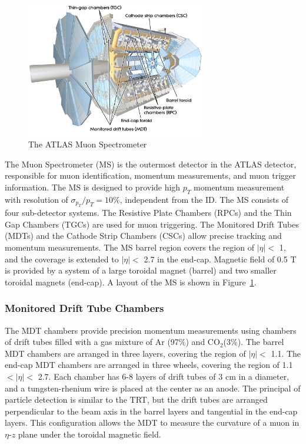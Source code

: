 \begin{figure}[!htb]
    \includegraphics[width=0.7\textwidth]{figures/ms.png}
    \centering
    \caption{The ATLAS Muon Spectrometer}
    \label{fig:ms}
\end{figure}
The Muon Spectrometer (MS) is the outermost detector in the ATLAS detector, responsible for muon identification, momentum measurements, and muon trigger information. The MS is designed to provide high $p_{T}$ momentum measurement with resolution of $\sigma_{p_{T}} / p_{T} = 10\%$, independent from the ID. The MS consists of four sub-detector systems. The Resistive Plate Chambers (RPCs) and the Thin Gap Chambers (TGCs) are used for muon triggering. The Monitored Drift Tubes (MDTs) and the Cathode Strip Chambers (CSCs) allow precise tracking and momentum measurements. The MS barrel region covers the region of $|\eta|<$ 1, and the coverage is extended to $|\eta|<$ 2.7 in the end-cap. Magnetic field of 0.5 T~\cite{ARNAUD2008265} is provided by a system of a large toroidal magnet (barrel) and two smaller toroidal magnets (end-cap). A layout of the MS is shown in Figure~\ref{fig:ms}.

\subsubsection{Monitored Drift Tube Chambers}
\label{sec:atlas:mdt}

The MDT chambers provide precision momentum measurements using chambers of drift tubes filled with a gas mixture of Ar (97\%) and $\mathrm{CO}_{2}$(3\%). The barrel MDT chambers are arranged in three layers, covering the region of $|\eta|<$ 1.1. The end-cap MDT chambers are arranged in three wheels, covering the region of 1.1 $<|\eta|<$ 2.7. Each chamber has 6-8 layers of drift tubes of 3 \si{\centi\meter} in a diameter, and a tungsten-rhenium wire is placed at the center as an anode. The principal of particle detection is similar to the TRT, but the drift tubes are arranged perpendicular to the beam axis in the barrel layers and tangential in the end-cap layers. This configuration allows the MDT to measure the curvature of a muon in $\eta$-$z$ plane under the toroidal magnetic field.

